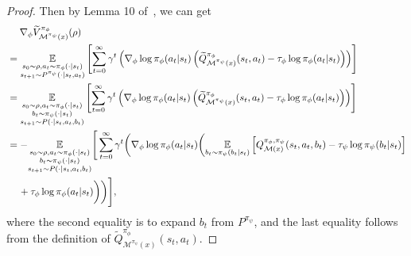 \documentclass{article}
\theoremstyle{plain}
\theoremstyle{definition}
\theoremstyle{remark}
\def\E{\mathbb E}
\def\cM{\mathcal M}
\begin{document}
\begin{proof}
    Then by Lemma 10 of~\citet{mei2020global}, we can get
    \begin{align}
       &\quad\; \nabla_\phi \widetilde{V}^{\pi_\phi}_{\cM^{\pi_\psi}(x)}(\rho) \notag \\
       & = \underset{\substack{s_0 \sim \rho, a_t \sim \pi_\phi(\cdot|s_t) \\s_{t+1} \sim P^{\pi_\psi}(\cdot|s_t,a_t)}}{\E} \left[\sum_{t=0}^{\infty} \gamma^t \left( \nabla_\phi \log \pi_\phi(a_t|s_t) \left( \widetilde{Q}^{\pi_\phi}_{\cM^{\pi_\psi}(x)}(s_t,a_t) - \tau_\phi \log \pi_\phi(a_t|s_t)\right) \right) \right]\notag \\
        & =  \underset{\substack{s_0 \sim \rho, a_t \sim \pi_\phi(\cdot|s_t) \\ b_t \sim \pi_\psi(\cdot|s_t) \\s_{t+1} \sim P(\cdot|s_t,a_t,b_t)}}{\E} \left[\sum_{t=0}^{\infty} \gamma^t \left( \nabla_\phi \log \pi_\phi(a_t|s_t) \left( \widetilde{Q}^{\pi_\phi}_{\cM^{\pi_\psi}(x)}(s_t,a_t) - \tau_\phi \log \pi_\phi(a_t|s_t)\right) \right) \right] \notag\\
        & = - \underset{\substack{s_0 \sim \rho, a_t \sim \pi_\phi(\cdot|s_t) \\ b_t \sim \pi_\psi(\cdot|s_t) \\s_{t+1} \sim P(\cdot|s_t,a_t,b_t)}}{\E} \Bigg[\sum_{t=0}^{\infty} \gamma^t \bigg( \nabla_\phi \log \pi_\phi(a_t|s_t) \bigg(  \underset{b_t \sim \pi_\psi(b_t|s_t)}{\E} \left[Q^{\pi_\phi,\pi_\psi}_{\cM(x)}(s_t,a_t,b_t)- \tau_\psi \log \pi_\psi(b_t|s_t)  \right] \notag \\
        &\quad \,  + \tau_\phi \log \pi_\phi(a_t|s_t)\bigg) \bigg) \Bigg],
    \end{align}
    where the second equality is to expand $b_t$ from $P^{\pi_\psi}$, and the last equality follows from the definition of $\widetilde{Q}^{\pi_\phi}_{\cM^{\pi_\psi}(x)}(s_t,a_t)$.


\end{proof}
\end{document}
